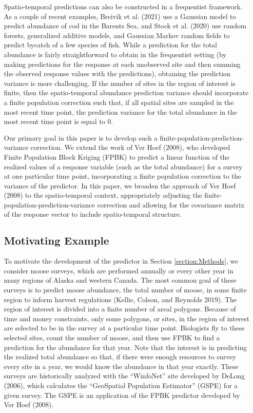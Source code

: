 \documentclass[smallextended]{svjour3}       %
\begin{document}
Spatio-temporal predictions can also be constructed in a frequentist
framework. As a couple of recent examples, Breivik et al. (2021) use a
Gaussian model to predict abundance of cod in the Barents Sea, and Stock
et al. (2020) use random forests, generalized additive models, and
Gaussian Markov random fields to predict bycatch of a few species of
fish. While a prediction for the total abundance is fairly
straightforward to obtain in the frequentist setting (by making
predictions for the response at each unobserved site and then summing
the observed response values with the predictions), obtaining the
prediction variance is more challenging. If the number of sites in the
region of interest is finite, then the spatio-temporal abundance
prediction variance should incorporate a finite population correction
such that, if all spatial sites are sampled in the most recent time
point, the prediction variance for the total abundance in the most
recent time point is equal to 0.

Our primary goal in this paper is to develop such a
finite-population-prediction-variance correction. We extend the work of
Ver Hoef (2008), who developed Finite Population Block Kriging (FPBK) to
predict a linear function of the realized values of a response variable
(such as the total abundance) for a survey at one particular time point,
incorporating a finite population correction to the variance of the
predictor. In this paper, we broaden the approach of Ver Hoef (2008) to
the spatio-temporal context, appropriately adjusting the
finite-population-prediction-variance correction and allowing for the
covariance matrix of the response vector to include spatio-temporal
structure.

\hypertarget{motivating-example}{%
\subsection{Motivating Example}\label{motivating-example}}

To motivate the development of the predictor in Section
\ref{section:Methods}, we consider moose surveys, which are performed
annually or every other year in many regions of Alaska and western
Canada. The most common goal of these surveys is to predict moose
abundance, the total number of moose, in some finite region to inform
harvest regulations (Kellie, Colson, and Reynolds 2019). The region of
interest is divided into a finite number of areal polygons. Because of
time and money constraints, only some polygons, or sites, in the region
of interest are selected to be in the survey at a particular time point.
Biologists fly to these selected sites, count the number of moose, and
then use FPBK to find a prediction for the abundance for that year. Note
that the interest is in predicting the realized total abundance so that,
if there were enough resources to survey every site in a year, we would
know the abundance in that year exactly. These surveys are historically
analyzed with the ``WinfoNet'' site developed by DeLong (2006), which
calculates the ``GeoSpatial Population Estimator'' (GSPE) for a given
survey. The GSPE is an application of the FPBK predictor developed by
Ver Hoef (2008).
\end{document}
